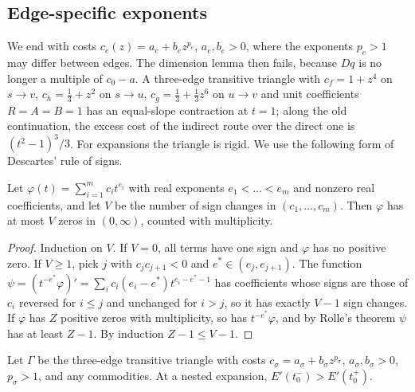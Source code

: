 \subsection{Edge-specific exponents}

We end with costs $c_e(z)=a_e+b_ez^{p_e}$, $a_e,b_e>0$, where the exponents
$p_e>1$ may differ between edges. The dimension lemma then fails, because
$Dq$ is no longer a multiple of $c_0-a$. A three-edge transitive triangle
with $c_f=1+z^4$ on $s\to v$, $c_h=\tfrac13+z^2$ on $s\to u$,
$c_g=\tfrac13+\tfrac13z^6$ on $u\to v$ and unit coefficients $R=A=B=1$ has an
equal-slope contraction at $t=1$; along the old continuation, the excess cost
of the indirect route over the direct one is $(t^2-1)^3/3$. For expansions the
triangle is rigid. We use the following form of Descartes' rule of signs.

\begin{lemma}\label{lem:descartes}
Let $\varphi(t)=\sum_{i=1}^mc_it^{e_i}$ with real exponents
$e_1<\dots<e_m$ and nonzero real coefficients, and let $V$ be the number of
sign changes in $(c_1,\dots,c_m)$. Then $\varphi$ has at most $V$ zeros in
$(0,\infty)$, counted with multiplicity.
\end{lemma}

\begin{proof}
Induction on $V$. If $V=0$, all terms have one sign and $\varphi$ has no
positive zero. If $V\ge1$, pick $j$ with $c_jc_{j+1}<0$ and
$e^*\in(e_j,e_{j+1})$. The function $\psi=(t^{-e^*}\varphi)'=
\sum_ic_i(e_i-e^*)t^{e_i-e^*-1}$ has coefficients whose signs are those of
$c_i$ reversed for $i\le j$ and unchanged for $i>j$, so it has exactly
$V-1$ sign changes. If $\varphi$ has $Z$ positive zeros with multiplicity,
so has $t^{-e^*}\varphi$, and by Rolle's theorem $\psi$ has at least $Z-1$.
By induction $Z-1\le V-1$.
\end{proof}

\begin{proposition}\label{prop:hetero}
Let $\Gamma$ be the three-edge transitive triangle with costs
$c_\sigma=a_\sigma+b_\sigma z^{p_\sigma}$, $a_\sigma,b_\sigma>0$,
$p_\sigma>1$, and any commodities. At a nested expansion,
$E'(t_0^-)>E'(t_0^+)$.
\end{proposition}

